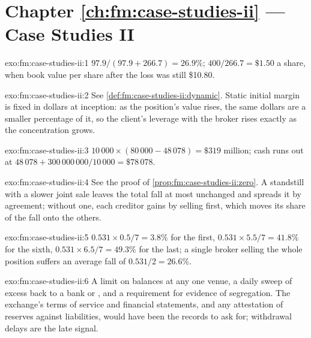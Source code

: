 \section*{Chapter \ref{ch:fm:case-studies-ii} --- Case Studies II}

\begin{solution}{exo:fm:case-studies-ii:1}
$97.9/(97.9+266.7)=26.9\%$; $400/266.7=\$1.50$ a share, when book value per share after the loss was still \$10.80.
\end{solution}

\begin{solution}{exo:fm:case-studies-ii:2}
See \cref{def:fm:case-studies-ii:dynamic}. Static initial margin is fixed in dollars at inception: as the position's value rises, the same dollars
are a smaller percentage of it, so the client's leverage with the broker rises exactly as the concentration grows.
\end{solution}

\begin{solution}{exo:fm:case-studies-ii:3}
$10\,000\times(80\,000-48\,078)=\$319$ million; cash runs out at $48\,078+300\,000\,000/10\,000=\$78\,078$.
\end{solution}

\begin{solution}{exo:fm:case-studies-ii:4}
See the proof of \cref{prop:fm:case-studies-ii:zero}. A standstill with a slower joint sale leaves the total fall at most unchanged and spreads it by
agreement; without one, each creditor gains by selling first, which moves its share of the fall onto the others.
\end{solution}

\begin{solution}{exo:fm:case-studies-ii:5}
$0.531\times0.5/7=3.8\%$ for the first, $0.531\times5.5/7=41.8\%$ for the sixth, $0.531\times6.5/7=49.3\%$ for the last; a single broker selling the
whole position suffers an average fall of $0.531/2=26.6\%$.
\end{solution}

\begin{solution}{exo:fm:case-studies-ii:6}
A limit on balances at any one venue, a daily sweep of excess back to a bank or , and a requirement for evidence of segregation. The
exchange's terms of service and financial statements, and any attestation of reserves against liabilities, would have been the records to ask for;
withdrawal delays are the late signal.
\end{solution}

